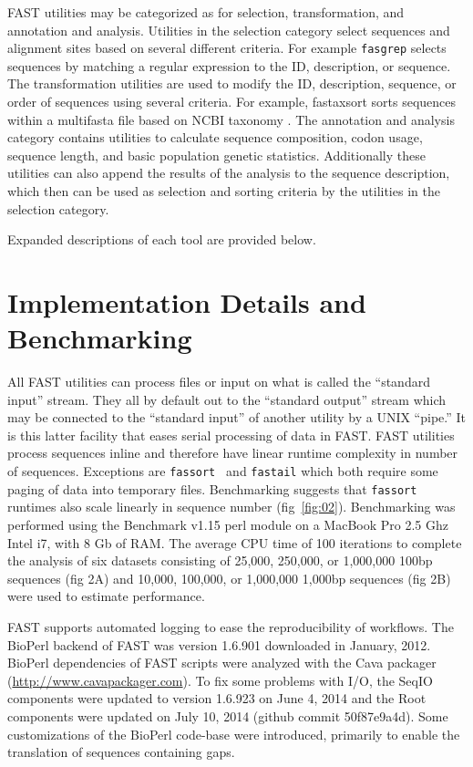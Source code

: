 \documentclass{frontiersSCNS} %
\begin{document}
FAST utilities may be categorized as for selection, transformation,
and annotation and analysis. Utilities in the selection category
select sequences and alignment sites based on several different
criteria. For example {\tt fasgrep} selects sequences by matching a regular
expression to the ID, description, or sequence. The transformation
utilities are used to modify the ID, description, sequence, or order
of sequences using several criteria. For example, fastaxsort sorts
sequences within a multifasta file based on NCBI taxonomy
\citep{Benson2009, Sayers2009}. The annotation and analysis category
contains utilities to calculate sequence composition, codon usage,
sequence length, and basic population genetic statistics. Additionally
these utilities can also append the results of the analysis to the
sequence description, which then can be used as selection and sorting
criteria by the utilities in the selection category.

Expanded descriptions of each tool are provided below.

\section{Implementation Details and Benchmarking}

All FAST utilities can process files or input on what is called the
``standard input'' stream. They all by default out to the ``standard
output'' stream which may be connected to the ``standard input'' of
another utility by a UNIX ``pipe.'' It is this latter facility that
eases serial processing of data in FAST. FAST utilities process
sequences inline and therefore have linear runtime complexity in
number of sequences. Exceptions are {\tt fassort } and {\tt fastail}
which both require some paging of data into temporary
files. Benchmarking suggests that {\tt fassort} runtimes also scale
linearly in sequence number (fig~\ref{fig:02}). Benchmarking was
performed using the Benchmark v1.15 perl module on a MacBook Pro 2.5
Ghz Intel i7, with 8 Gb of RAM. The average CPU time of 100 iterations
to complete the analysis of six datasets consisting of 25,000,
250,000, or 1,000,000 100bp sequences (fig 2A) and 10,000, 100,000, or
1,000,000 1,000bp sequences (fig 2B) were used to estimate
performance.

FAST supports automated logging to ease the reproducibility of
workflows. The BioPerl backend of FAST was version 1.6.901 downloaded in January,
2012. BioPerl dependencies of FAST scripts were analyzed with the Cava
packager (\url{http://www.cavapackager.com}). To fix some problems with
I/O, the SeqIO components were updated to version 1.6.923 on
June 4, 2014 and the Root components were updated on July 10, 2014 (github commit 50f87e9a4d). 
Some customizations of the BioPerl code-base were introduced, primarily 
to enable the translation of sequences containing gaps. 
\end{document}

